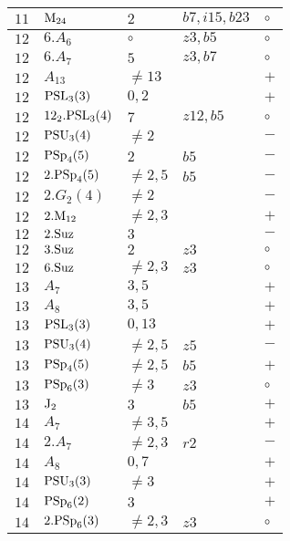 \documentclass[a4paper, 11pt]{article}
\begin{document}
\begin{longtable}{lllll}
		$11$ & ${\rm M}_{24}$ & $2$ & $b7, i15, b23$ & $\circ$ \\ \hline
		$12$ & $6.A_{6}$ & $\circ$ & $z3, b5$ & $\circ$ \\ \hline
		$12$ & $6.A_{7}$ & $5$ & $z3, b7$ & $\circ$ \\ \hline
		$12$ & $A_{13}$ & $\neq 13$ & & $+$ \\ \hline
		$12$ & ${\rm PSL}_{3}(3)$ & $0,2$ & & $+$ \\ \hline
		$12$ & $12_2.{\rm PSL}_{3}(4)$ & $7$ & $z12, b5$ & $\circ$ \\ \hline
		$12$ & ${\rm PSU}_{3}(4)$ & $\neq 2$ & & $-$ \\ \hline
		$12$ & ${\rm PSp}_{4}(5)$ & $2$ & $b5$ & $-$ \\ \hline
		$12$ & $2.{\rm PSp}_{4}(5)$ & $\neq 2,5$ & $b5$ & $-$ \\ \hline
		$12$ & $2.G_{2}(4)$ & $\neq 2$ & & $-$ \\ \hline
		$12$ & $2.{\rm M}_{12}$ & $\neq 2,3$ & & $+$ \\ \hline
		$12$ & $2.{\rm Suz}$ & $3$ & & $-$ \\ \hline
		$12$ & $3.{\rm Suz}$ & $2$ & $z3$ & $\circ$ \\ \hline
		$12$ & $6.{\rm Suz}$ & $\neq 2,3$ & $z3$ & $\circ$ \\ \hline
		$13$ & $A_{7}$ & $3,5$ & & $+$ \\ \hline
		$13$ & $A_{8}$ & $3,5$ & & $+$ \\ \hline
		$13$ & ${\rm PSL}_{3}(3)$ & $0,13$ & & $+$ \\ \hline
		$13$ & ${\rm PSU}_{3}(4)$ & $\neq 2,5$ & $z5$ & $-$ \\ \hline
		$13$ & ${\rm PSp}_{4}(5)$ & $\neq 2,5$ & $b5$ & $+$ \\ \hline
		$13$ & ${\rm PSp}_{6}(3)$ & $\neq 3$ & $z3$ & $\circ$ \\ \hline
		$13$ & ${\rm J}_2$ & $3$ & $b5$ & $+$ \\ \hline
		$14$ & $A_{7}$ & $\neq 3,5$ & & $+$ \\ \hline
		$14$ & $2.A_{7}$ & $\neq 2,3$ & $r2$ & $-$ \\ \hline
		$14$ & $A_{8}$ & $0,7$ & & $+$ \\ \hline
		$14$ & ${\rm PSU}_{3}(3)$ & $\neq 3$ & & $+$ \\ \hline
		$14$ & ${\rm PSp}_{6}(2)$ & $3$ & & $+$ \\ \hline
		$14$ & $2.{\rm PSp}_{6}(3)$ & $\neq 2,3$ & $z3$ & $\circ$ \\ \hline

\end{longtable}
\end{document}
